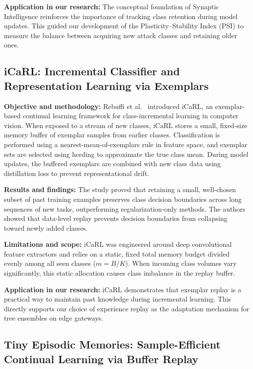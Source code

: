 \smallskip
\noindent\textbf{Application in our research:} The conceptual foundation of Synaptic Intelligence reinforces the importance of tracking class retention during model updates. This guided our development of the Plasticity--Stability Index (PSI) to measure the balance between acquiring new attack classes and retaining older ones.

\subsection{iCaRL: Incremental Classifier and Representation Learning via Exemplars}

\noindent\textbf{Objective and methodology:} Rebuffi et al.~\cite{rebuffi2017icarl} introduced iCaRL, an exemplar-based continual learning framework for class-incremental learning in computer vision. When exposed to a stream of new classes, iCaRL stores a small, fixed-size memory buffer of exemplar samples from earlier classes. Classification is performed using a nearest-mean-of-exemplars rule in feature space, and exemplar sets are selected using herding to approximate the true class mean. During model updates, the buffered exemplars are combined with new class data using distillation loss to prevent representational drift.

\smallskip
\noindent\textbf{Results and findings:} The study proved that retaining a small, well-chosen subset of past training examples preserves class decision boundaries across long sequences of new tasks, outperforming regularization-only methods. The authors showed that data-level replay prevents decision boundaries from collapsing toward newly added classes.

\smallskip
\noindent\textbf{Limitations and scope:} iCaRL was engineered around deep convolutional feature extractors and relies on a static, fixed total memory budget divided evenly among all seen classes ($m = B/K$). When incoming class volumes vary significantly, this static allocation causes class imbalance in the replay buffer.

\smallskip
\noindent\textbf{Application in our research:} iCaRL demonstrates that exemplar replay is a practical way to maintain past knowledge during incremental learning. This directly supports our choice of experience replay as the adaptation mechanism for tree ensembles on edge gateways.

\subsection{Tiny Episodic Memories: Sample-Efficient Continual Learning via Buffer Replay}

